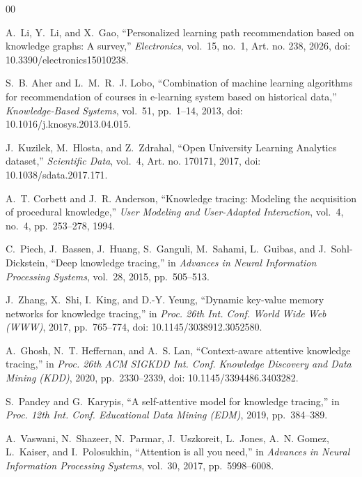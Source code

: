 \documentclass[conference]{IEEEtran}
\begin{document}
\begin{thebibliography}{00}

A.~Li, Y.~Li, and X.~Gao, ``Personalized learning path recommendation based on knowledge
graphs: A survey,'' \emph{Electronics}, vol.~15, no.~1, Art. no. 238, 2026,
doi: 10.3390/electronics15010238.

S.~B. Aher and L.~M.~R.~J. Lobo, ``Combination of machine learning algorithms for
recommendation of courses in e-learning system based on historical data,''
\emph{Knowledge-Based Systems}, vol.~51, pp.~1--14, 2013,
doi: 10.1016/j.knosys.2013.04.015.

J.~Kuzilek, M.~Hlosta, and Z.~Zdrahal, ``Open University Learning Analytics dataset,''
\emph{Scientific Data}, vol.~4, Art. no. 170171, 2017, doi: 10.1038/sdata.2017.171.

A.~T. Corbett and J.~R. Anderson, ``Knowledge tracing: Modeling the acquisition of
procedural knowledge,'' \emph{User Modeling and User-Adapted Interaction}, vol.~4,
no.~4, pp.~253--278, 1994.

C.~Piech, J.~Bassen, J.~Huang, S.~Ganguli, M.~Sahami, L.~Guibas, and J.~Sohl-Dickstein,
``Deep knowledge tracing,'' in \emph{Advances in Neural Information Processing Systems},
vol.~28, 2015, pp.~505--513.

J.~Zhang, X.~Shi, I.~King, and D.-Y. Yeung, ``Dynamic key-value memory networks for
knowledge tracing,'' in \emph{Proc. 26th Int. Conf. World Wide Web (WWW)}, 2017,
pp.~765--774, doi: 10.1145/3038912.3052580.

A.~Ghosh, N.~T. Heffernan, and A.~S. Lan, ``Context-aware attentive knowledge tracing,''
in \emph{Proc. 26th ACM SIGKDD Int. Conf. Knowledge Discovery and Data Mining (KDD)},
2020, pp.~2330--2339, doi: 10.1145/3394486.3403282.

S.~Pandey and G.~Karypis, ``A self-attentive model for knowledge tracing,'' in
\emph{Proc. 12th Int. Conf. Educational Data Mining (EDM)}, 2019, pp.~384--389.

A.~Vaswani, N.~Shazeer, N.~Parmar, J.~Uszkoreit, L.~Jones, A.~N. Gomez, L.~Kaiser, and
I.~Polosukhin, ``Attention is all you need,'' in \emph{Advances in Neural Information
Processing Systems}, vol.~30, 2017, pp.~5998--6008.


\end{thebibliography}
\end{document}
